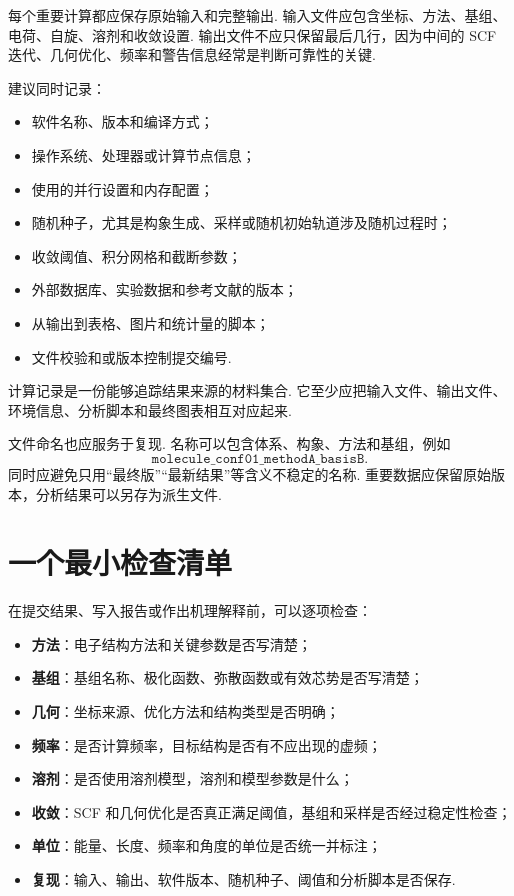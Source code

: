 \documentclass[UTF8,11pt,a4paper,openany]{ctexbook}
\begin{document}
每个重要计算都应保存原始输入和完整输出. 输入文件应包含坐标、方法、基组、电荷、自旋、溶剂和收敛设置. 输出文件不应只保留最后几行，因为中间的 SCF 迭代、几何优化、频率和警告信息经常是判断可靠性的关键. 

建议同时记录：

\begin{itemize}
\item 软件名称、版本和编译方式；
\item 操作系统、处理器或计算节点信息；
\item 使用的并行设置和内存配置；
\item 随机种子，尤其是构象生成、采样或随机初始轨道涉及随机过程时；
\item 收敛阈值、积分网格和截断参数；
\item 外部数据库、实验数据和参考文献的版本；
\item 从输出到表格、图片和统计量的脚本；
\item 文件校验和或版本控制提交编号. 
\end{itemize}

\begin{definitionbox}
计算记录是一份能够追踪结果来源的材料集合. 它至少应把输入文件、输出文件、环境信息、分析脚本和最终图表相互对应起来. 
\end{definitionbox}

文件命名也应服务于复现. 名称可以包含体系、构象、方法和基组，例如
\[
\texttt{molecule\_conf01\_methodA\_basisB}.
\]
同时应避免只用“最终版”“最新结果”等含义不稳定的名称. 重要数据应保留原始版本，分析结果可以另存为派生文件. 

\section{一个最小检查清单}

在提交结果、写入报告或作出机理解释前，可以逐项检查：

\begin{itemize}
\item \textbf{方法}：电子结构方法和关键参数是否写清楚；
\item \textbf{基组}：基组名称、极化函数、弥散函数或有效芯势是否写清楚；
\item \textbf{几何}：坐标来源、优化方法和结构类型是否明确；
\item \textbf{频率}：是否计算频率，目标结构是否有不应出现的虚频；
\item \textbf{溶剂}：是否使用溶剂模型，溶剂和模型参数是什么；
\item \textbf{收敛}：SCF 和几何优化是否真正满足阈值，基组和采样是否经过稳定性检查；
\item \textbf{单位}：能量、长度、频率和角度的单位是否统一并标注；
\item \textbf{复现}：输入、输出、软件版本、随机种子、阈值和分析脚本是否保存. 
\end{itemize}
\end{document}
